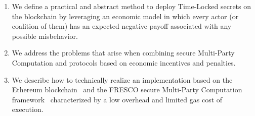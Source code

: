 \begin{enumerate}

	\smallskip
 	\item We define a practical and abstract method to deploy Time-Locked secrets on the blockchain by leveraging an economic model in which every actor (or coalition of them) has an expected negative payoff associated with any possible misbehavior.
 	
 	\smallskip
 	\item We address the problems that arise when combining secure Multi-Party Computation and protocols based on economic incentives and penalties. 
  
  	\smallskip
 	\item We describe how to technically realize an implementation based on the Ethereum blockchain~\cite{wood2014ethereum} and the FRESCO secure Multi-Party Computation framework~\cite{damgaard2016mpc} characterized by a low overhead and limited gas cost of execution.

\end{enumerate}


